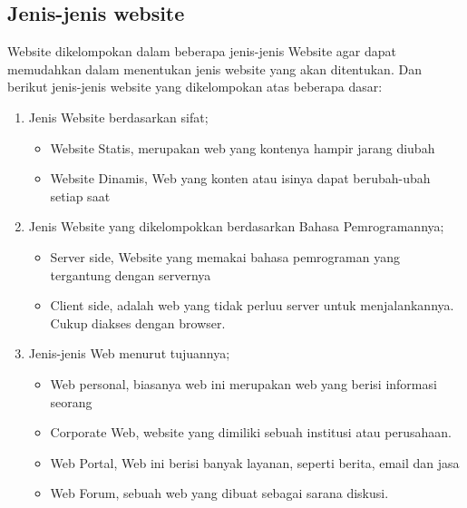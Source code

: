 \subsection{Jenis-jenis website}
Website dikelompokan dalam beberapa jenis-jenis Website agar dapat memudahkan dalam menentukan jenis website
yang akan ditentukan. Dan berikut jenis-jenis website yang dikelompokan atas beberapa dasar:
\begin{enumerate}
\item Jenis Website berdasarkan sifat;
\begin{itemize}
\item Website Statis, merupakan web yang kontenya hampir jarang diubah
\item Website Dinamis, Web yang konten atau isinya dapat berubah-ubah setiap saat
\end{itemize}
\item Jenis Website yang dikelompokkan berdasarkan Bahasa Pemrogramannya;
\begin{itemize}
\item Server side, Website yang memakai bahasa pemrograman yang tergantung dengan servernya
\item Client side, adalah web yang tidak perluu server untuk menjalankannya. Cukup diakses dengan browser.
\end{itemize}
\item Jenis-jenis Web menurut tujuannya;
\begin{itemize}
\item Web personal, biasanya web ini merupakan web yang berisi informasi seorang
\item Corporate Web, website yang dimiliki sebuah institusi atau perusahaan.
\item Web Portal, Web ini berisi banyak layanan, seperti berita, email dan jasa
\item Web Forum, sebuah web yang dibuat sebagai sarana diskusi.
\end{itemize}
\end{enumerate}
	

